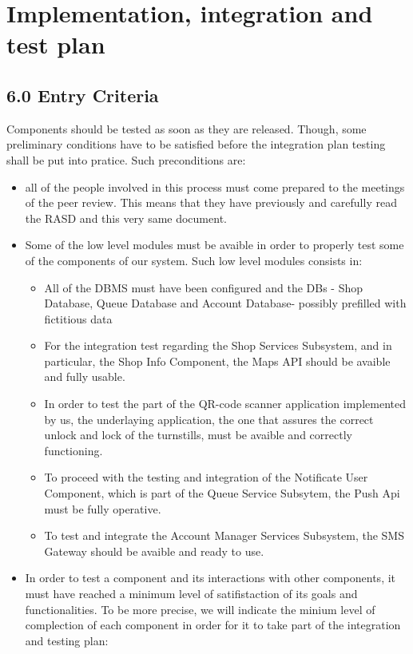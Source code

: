 \section{Implementation, integration and test plan}
\label{sect:implementationintegrationandtestplan}

\subsection{6.0 Entry Criteria}
\label{subsect: entrycriteria}
Components should be tested as soon as they are released. Though, some preliminary conditions have to be satisfied before the integration plan testing shall be put into pratice.
Such preconditions are:
\begin{itemize}
    \item all of the people involved in this process must come prepared to the meetings of the peer review. This means that they have previously and carefully read the RASD and this very same document.
    \item Some of the low level modules must be avaible in order to properly test some of the components of our system. Such low level modules consists in:
        \begin{itemize}
            \item All of the DBMS must have been configured and the DBs - Shop Database, Queue Database and Account Database- possibly prefilled with fictitious data
            \item For the integration test regarding the Shop Services Subsystem, and in particular, the Shop Info Component, the Maps API should be avaible and fully usable.
            \item In order to test the part of the QR-code scanner application implemented by us, the underlaying application, the one that assures the correct unlock and lock of the turnstills, must be avaible and correctly functioning. 
            \item To proceed with the testing and integration of the Notificate User Component, which is part of the Queue Service Subsytem, the Push Api must be fully operative.
            \item To test and integrate the Account Manager Services Subsystem, the SMS Gateway should be avaible and ready to use.
        \end{itemize}
        \item In order to test a component and its interactions with other components, it must have reached a minimum level of satifistaction of its goals and functionalities. To be more precise, we will indicate the minium level of complection of each component in order for it to take part of the integration and testing plan:

\end{itemize}
